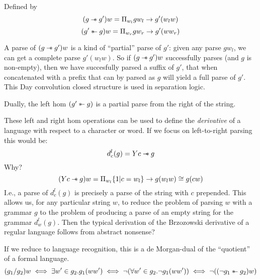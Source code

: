 \documentclass[12pt]{article}
\newcommand\rsepimp{\mathbin{-\mkern-6mu*}}
\newcommand\lsepimp{\mathbin{\rotatebox[origin=c]{180}{$-\mkern-6mu*$}}}
\begin{document}
Defined by
\[ (g \rsepimp g')w = \Pi_{w_l} g w_l \to g'(w_lw) \]
\[ (g' \lsepimp g)w = \Pi_{w_r} g w_r \to g'(ww_r) \]

A parse of $(g \rsepimp g')w$ is a kind of ``partial'' parse of $g'$:
given any parse $g w_l$, we can get a complete parse $g' (w_lw)$. So
if $(g \rsepimp g') w$ successfully parses (and $g$ is non-empty),
then we have succesfully parsed a suffix of $g'$, that when
concatenated with a prefix that can by parsed as $g$ will yield a full
parse of $g'$.
%
This Day convolution closed structure is used in separation logic.

Dually, the left hom $(g' \lsepimp g)$ is a partial parse from
the right of the string.

These left and right hom operations can be used to define the
\emph{derivative} of a language with respect to a character or
word. If we focus on left-to-right parsing this would be:
\[ d^l_c(g) = Yc \rsepimp g \]
Why?
\[ (Yc \rsepimp g)w = \Pi_{w_l} \{ 1 | c = w_l \} \to g(w_lw) \cong g(cw) \]
I.e., a parse of $d^l_c(g)$ is precisely a parse of the string with
$c$ prepended.
%
This allows us, for any particular string $w$, to reduce the problem
of parsing $w$ with a grammar $g$ to the problem of producing a parse
of an empty string for the grammar $d^l_w(g)$. Then the typical
derivation of the Brzozowski derivative of a regular language follows
from abstract nonsense?

If we reduce to language recognition, this is a de Morgan-dual of the
``quotient'' of a formal language.
\[ (g_1 / g_2) w \iff \exists w' \in g_2. g_1(ww') \iff \neg (\forall w' \in g_2. \neg g_1(ww')) \iff \neg ((\neg g_1 \lsepimp g_2) w) \]



\end{document}
